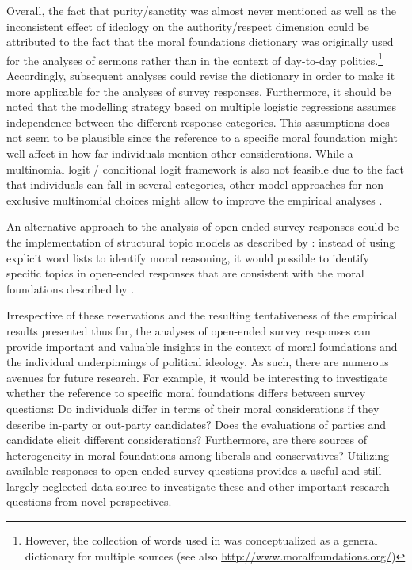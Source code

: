 \documentclass[12pt]{article}
\begin{document}
Overall, the fact that purity/sanctity was almost never mentioned as well as the inconsistent effect of ideology on the authority/respect dimension could be attributed to the fact that the moral foundations dictionary was originally used for the analyses of sermons rather than in the context of day-to-day politics.\footnote{However, the collection of words used in \citet{graham2009liberals} was conceptualized as a general dictionary for multiple sources (see also \url{http://www.moralfoundations.org/})} Accordingly, subsequent analyses could revise the dictionary in order to make it more applicable for the analyses of survey responses. Furthermore, it should be noted that the modelling strategy based on multiple logistic regressions assumes independence between the different response categories. This assumptions does not seem to be plausible since the reference to a specific moral foundation might well affect in how far individuals mention other considerations. While a multinomial logit / conditional logit framework is also not feasible due to the fact that individuals can fall in several categories, other model approaches for non-exclusive multinomial choices might allow to improve the empirical analyses \citep[see for example][]{gilbert2007models}.

An alternative approach to the analysis of open-ended survey responses could be the implementation of structural topic models as described by \citet{roberts2014structural}: instead of using explicit word lists to identify moral reasoning, it would possible to identify specific topics in open-ended responses that are consistent with the moral foundations described by \citet{haidt2008moral} \citep[see also][]{lin2008joint}.

Irrespective of these reservations and the resulting tentativeness of the empirical results presented thus far, the analyses of open-ended survey responses can provide important and valuable insights in the context of moral foundations and the individual underpinnings of political ideology. As such, there are numerous avenues for future research. For example, it would be interesting to investigate whether the reference to specific moral foundations differs between survey questions: Do individuals differ in terms of their moral considerations if they describe in-party or out-party candidates? Does the evaluations of parties and candidate elicit different considerations? Furthermore, are there sources of heterogeneity in moral foundations among liberals and conservatives? Utilizing available responses to open-ended survey questions provides a useful and still largely neglected data source to investigate these and other important research questions from novel perspectives.
\end{document}
